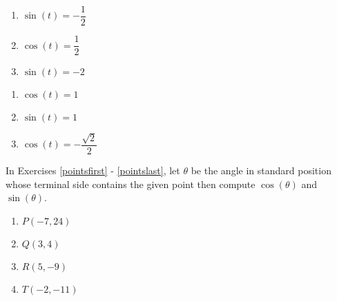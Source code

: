 \documentclass{ximera}
\begin{document}
\begin{multicols}{3}

\begin{enumerate}

\setcounter{enumi}{\value{HW}}

\item $\sin(t) = -\dfrac{1}{2}$
\item $\cos(t) = \dfrac{1}{2}$
\item $\sin(t) = -2$ 

\setcounter{HW}{\value{enumi}}

\end{enumerate}

\end{multicols}

\begin{multicols}{3}

\begin{enumerate}

\setcounter{enumi}{\value{HW}}

\item $\cos(t) = 1$ 
\item $\sin(t) = 1$ 
\item $\cos(t) = -\dfrac{\sqrt{2}}{2}$ \label{solvefortlast}

\setcounter{HW}{\value{enumi}}

\end{enumerate}

\end{multicols}

In Exercises \ref{pointsfirst} - \ref{pointslast}, let $\theta$ be the angle in standard position whose terminal side contains the given point then compute $\cos(\theta)$ and $\sin(\theta)$.

\begin{multicols}{4}

\begin{enumerate}

\setcounter{enumi}{\value{HW}}

\item $P(-7, 24)$ \label{pointsfirst} 
\item $Q(3, 4)$
\item $R(5, -9)$
\item $T(-2, -11)$ \label{pointslast}

\setcounter{HW}{\value{enumi}}

\end{enumerate}

\end{multicols}
\end{document}
